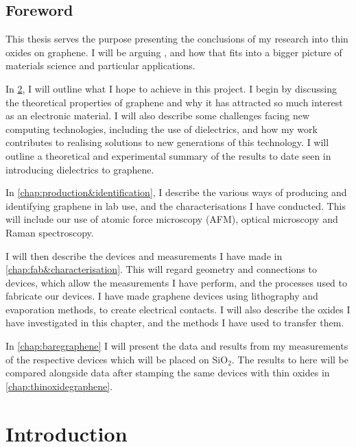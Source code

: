 \documentclass{report}
\begin{document}
	\newpage 
	\renewcommand{\baselinestretch}{0.94}\normalsize
	\tableofcontents
	\renewcommand{\baselinestretch}{1}\normalsize
	
	\section{Foreword}
	This thesis serves the purpose presenting the conclusions of my research into thin oxides on graphene. I will be arguing {}, and how that fits into a bigger picture of materials science and particular applications. %
	
	In \cref{chap:introduction}, I will outline what I hope to achieve in this project. I begin by discussing the theoretical properties of graphene and why it has attracted so much interest as an electronic material. I will also describe some challenges facing new computing technologies, including the use of dielectrics, and how my work contributes to realising solutions to new generations of this technology. I will outline a theoretical and experimental summary of the results to date seen in introducing dielectrics to graphene.
	
	In \cref{chap:production&identification}, I describe the various ways of producing and identifying graphene in lab use, and the characterisations I have conducted. This will include our use of atomic force microscopy (AFM), optical microscopy and Raman spectroscopy.
	
	I will then describe the devices and measurements I have made in \cref{chap:fab&characterisation}. This will regard geometry and connections to devices, which allow the measurements I have perform, and the processes used to fabricate our devices. I have made graphene devices using lithography and evaporation methods, to create electrical contacts. I will also describe the oxides I have investigated in this chapter, and the methods I have used to transfer them.
	
	In \cref{chap:baregraphene} I will present the data and results from my measurements of the respective devices which will be placed on SiO$_2$. The results to here will be compared alongside data after stamping the same devices with thin oxides in  \cref{chap:thinoxidegraphene}.
	
	\chapter{Introduction}\label{chap:introduction}
	
	
\end{document}

